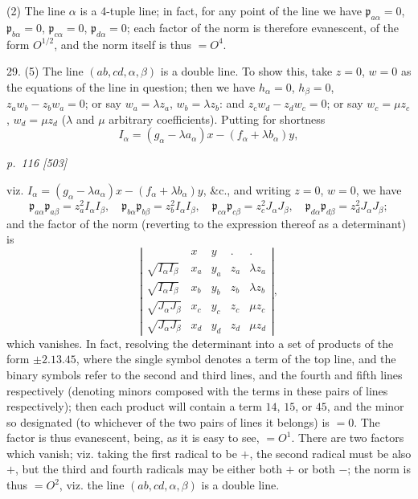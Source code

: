 \documentclass[11pt,a4paper]{article}
\newcommand{\sourcepage}[2]{%
  \bigskip
  \noindent\textit{p.~#1 [#2]}%
  \par\smallskip
}
\newcommand{\Det}[1]{\left|\begin{matrix}#1\end{matrix}\right|}
\newcommand{\p}{\mathfrak p}
\begin{document}
(2) The line $\alpha$ is a 4-tuple line; in fact, for any point of the line we have
$\p_{a\alpha}=0$, $\p_{b\alpha}=0$, $\p_{c\alpha}=0$, $\p_{d\alpha}=0$; each factor
of the norm is therefore evanescent, of the form $O^{1/2}$, and the norm itself is
thus $=O^4$.

29. (5) The line $(ab,cd,\alpha,\beta)$ is a double line. To show this, take
$z=0$, $w=0$ as the equations of the line in question; then we have $h_\alpha=0$,
$h_\beta=0$, $z_aw_b-z_bw_a=0$; or say $w_a=\lambda z_a$, $w_b=\lambda z_b$:
and $z_cw_d-z_dw_c=0$; or say $w_c=\mu z_c$, $w_d=\mu z_d$
($\lambda$ and $\mu$ arbitrary coefficients). Putting for shortness
\[
I_\alpha=(g_\alpha-\lambda a_\alpha)x-(f_\alpha+\lambda b_\alpha)y,
\]

\sourcepage{116}{503}
viz. $I_\alpha=(g_\alpha-\lambda a_\alpha)x-(f_\alpha+\lambda b_\alpha)y$, \&c.,
and writing $z=0$, $w=0$, we have
\[
\p_{a\alpha}\p_{a\beta}=z_a^2I_\alpha I_\beta,\quad
\p_{b\alpha}\p_{b\beta}=z_b^2I_\alpha I_\beta,\quad
\p_{c\alpha}\p_{c\beta}=z_c^2J_\alpha J_\beta,\quad
\p_{d\alpha}\p_{d\beta}=z_d^2J_\alpha J_\beta;
\]
and the factor of the norm (reverting to the expression thereof as a determinant) is
\[
\Det{
&x&y&.&.\\
\sqrt{I_\alpha I_\beta}&x_a&y_a&z_a&\lambda z_a\\
\sqrt{I_\alpha I_\beta}&x_b&y_b&z_b&\lambda z_b\\
\sqrt{J_\alpha J_\beta}&x_c&y_c&z_c&\mu z_c\\
\sqrt{J_\alpha J_\beta}&x_d&y_d&z_d&\mu z_d},
\]
which vanishes. In fact, resolving the determinant into a set of products of the
form $\pm2.13.45$, where the single symbol denotes a term of the top line, and
the binary symbols refer to the second and third lines, and the fourth and fifth
lines respectively (denoting minors composed with the terms in these pairs of lines
respectively); then each product will contain a term $14$, $15$, or $45$, and the
minor so designated (to whichever of the two pairs of lines it belongs) is $=0$.
The factor is thus evanescent, being, as it is easy to see, $=O^1$. There are two
factors which vanish; viz. taking the first radical to be $+$, the second radical must
be also $+$, but the third and fourth radicals may be either both $+$ or both $-$;
the norm is thus $=O^2$, viz. the line $(ab,cd,\alpha,\beta)$ is a double line.
\end{document}
